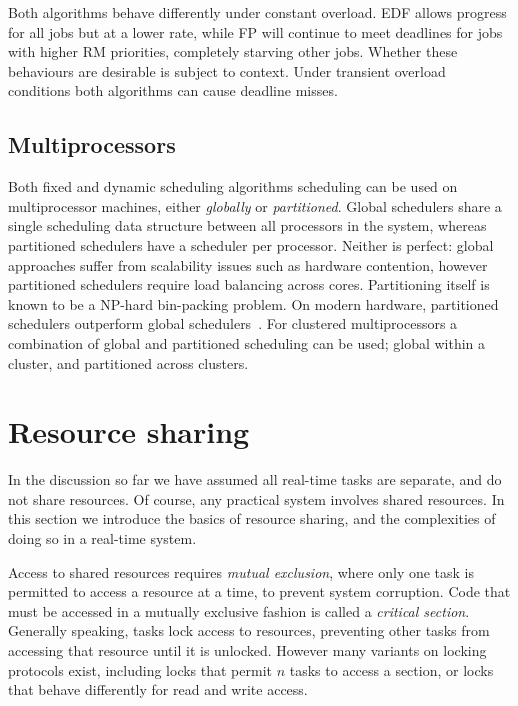 Both algorithms behave differently under constant
overload. \gls{EDF} allows progress for all jobs but at a lower rate, while \gls{FP} will
continue to meet deadlines for jobs with higher \gls{RM} priorities, completely starving other
jobs. Whether these behaviours are desirable is subject to context.  Under
transient overload conditions both algorithms can cause deadline misses.


\subsection{Multiprocessors}

Both fixed and dynamic scheduling algorithms scheduling can be used on multiprocessor machines, either
\emph{globally} or \emph{partitioned}. Global schedulers share a single scheduling data structure
between all processors in the system, whereas partitioned schedulers have a scheduler per processor.
Neither is perfect: global approaches suffer from scalability issues such as hardware contention,
however partitioned schedulers require load balancing across cores.  Partitioning itself is known to
be a NP-hard bin-packing problem.  On modern hardware, partitioned schedulers outperform global
schedulers~\citep{Brandenburg:phd}.  For clustered multiprocessors a combination of global and
partitioned scheduling can be used; global within a cluster, and partitioned across clusters.

\section{Resource sharing}
\label{sec:resource-sharing-theory}

In the discussion so far we have assumed all real-time tasks are separate, and do not share resources.
Of course, any practical system involves shared resources. In this section we introduce the basics
of resource sharing, and the complexities of doing so in a real-time system.

Access to shared resources requires \emph{mutual exclusion}, where only one 
task is permitted to access a resource at a time, to prevent system corruption. Code that
must be accessed in a mutually exclusive fashion is called a \emph{critical section}. Generally
speaking, tasks lock access to resources, preventing other tasks from accessing that resource
until it is unlocked. However many variants on locking protocols exist, including locks that permit
$n$ tasks to access a section, or locks that behave differently for read and write access.


